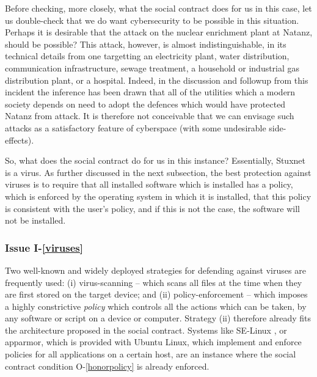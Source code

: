 Before checking, more closely, what the social contract does for us in
this case, let us double-check that we do want cybersecurity to be possible
in this situation. Perhaps it is desirable that the attack
on the nuclear enrichment plant at Natanz, should be possible?
This attack, however, is almost indistinguishable, in its technical details
from one targetting an electricity plant, water distribution, communication
infrastructure, sewage treatment, a household or industrial gas distribution plant,
or a hospital. Indeed, in the discussion and followup from this incident
the inference has been drawn that all of the utilities which a modern society
depends on need to adopt the defences which would have protected Natanz from
attack. It is therefore not conceivable that we can envisage such attacks as
a satisfactory feature of cyberspace (with some undesirable side-effects).

So, what does the social contract do for us in this instance?
Essentially, Stuxnet is a virus. As further discussed in the next
subsection, the best protection against viruses is to require that all
installed software which is installed has a policy,  which is enforced
by the operating system in which it is installed, that this policy is
consistent with the user's policy, and if this is not the case, the
software will not be installed.
\fi

\subsubsection*{Issue I-\ref{viruses}}\label{virusessol}

Two well-known and widely deployed strategies for defending against
viruses are frequently used: (i) virus-scanning -- which scans all files
at the time when they are first stored on the target device; and (ii)
policy-enforcement -- which imposes a highly constrictive {\em policy}
which controls all the actions which can be taken, by any software or
script on a device or computer.  
%
Strategy (ii) therefore already fits the architecture proposed in the
social contract. Systems like SE-Linux \cite{SELinux}, or
apparmor, which is provided with Ubuntu Linux, which implement and enforce
policies for all applications on a certain host, are an instance where
the social contract condition O-\ref{honorpolicy} is already enforced.



